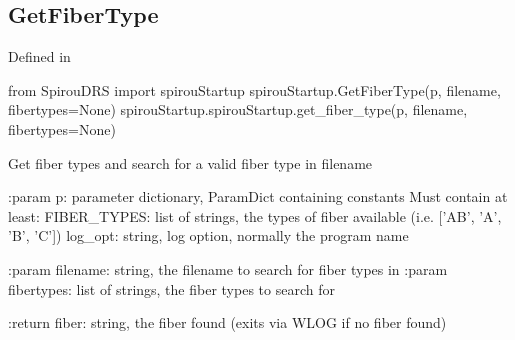 \begin{minipage}{\textwidth}
\subsection{GetFiberType}

Defined in \spirouStartup{}

\begin{pythonbox}
from SpirouDRS import spirouStartup
spirouStartup.GetFiberType(p, filename, fibertypes=None)
spirouStartup.spirouStartup.get_fiber_type(p, filename, fibertypes=None)
\end{pythonbox}

\begin{pythondocstring}
Get fiber types and search for a valid fiber type in filename

:param p: parameter dictionary, ParamDict containing constants
    Must contain at least:
            FIBER_TYPES: list of strings, the types of fiber available
                         (i.e. ['AB', 'A', 'B', 'C'])
            log_opt: string, log option, normally the program name

:param filename: string, the filename to search for fiber types in
:param fibertypes: list of strings, the fiber types to search for

:return fiber: string, the fiber found (exits via WLOG if no fiber found)
\end{pythondocstring}
\end{minipage}



